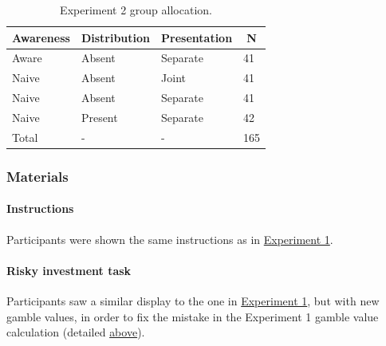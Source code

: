 \documentclass[a4paper, nobind, dvipsnames]{templates/ociamthesis}
\theoremstyle{definition}
\theoremstyle{definition}
\theoremstyle{definition}
\theoremstyle{definition}
\theoremstyle{remark}
\begin{document}
\begin{table}[tbp]

\begin{center}
\begin{threeparttable}

\caption{\label{tab:condition-allocation-aggregation-2}Experiment 2 group allocation.}

\begin{tabular}{llll}
\toprule
Awareness & \multicolumn{1}{c}{Distribution} & \multicolumn{1}{c}{Presentation} & \multicolumn{1}{c}{N}\\
\midrule
Aware & Absent & Separate & 41\\
Naive & Absent & Joint & 41\\
Naive & Absent & Separate & 41\\
Naive & Present & Separate & 42\\
Total & - & - & 165\\
\bottomrule
\end{tabular}

\end{threeparttable}
\end{center}

\end{table}

\hypertarget{materials-1}{%
\subsubsection{Materials}\label{materials-1}}

\hypertarget{instructions}{%
\paragraph{Instructions}\label{instructions}}

Participants were shown the same instructions as in
\protect\hyperlink{instructions-materials-aggregation-1}{Experiment 1}.

\hypertarget{task-aggregation-2}{%
\paragraph{Risky investment task}\label{task-aggregation-2}}

Participants saw a similar display to the one in
\protect\hyperlink{task-aggregation-1}{Experiment 1}, but with new gamble values, in order to fix
the mistake in the Experiment 1 gamble value calculation (detailed
\protect\hyperlink{outcome-distribution-aggregation-1}{above}).
\end{document}
